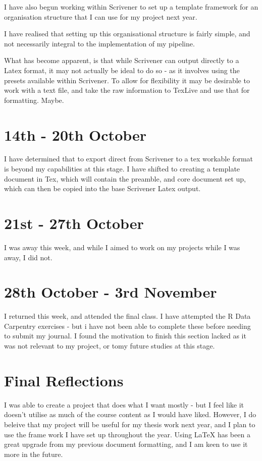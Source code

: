 \documentclass{article}
\begin{document}
I have also begun working within Scrivener to set up a template framework for an organisation structure that I can use for my project next year.

I have realised that setting up this organisational structure is fairly simple, and not necessarily integral to the implementation of my pipeline. 

What has become apparent, is that while Scrivener can output directly to a Latex format, it may not actually be ideal to do so - as it involves using the presets available within Scrivener. To allow for flexibility it may be desirable to work with a text file, and take the raw information to TexLive and use that for formatting. Maybe.

\section{14th - 20th October}

I have determined that to export direct from Scrivener to a tex workable format is beyond my capabilities at this stage. I have shifted to creating a template document in Tex, which will contain the preamble, and core document set up, which can then be copied into the base Scrivener Latex output. 

\section{21st - 27th October}

I was away this week, and while I aimed to work on my projects while I was away, I did not. 

\section{28th October - 3rd November}

I returned this week, and attended the final class. 
I have attempted the R Data Carpentry exercises - but i have not been able to complete these before needing to submit my journal. 
I found the motivation to finish this section lacked as it was not relevant to my project, or tomy future studies at this stage.

\section*{Final Reflections}

I was able to create a project that does what I want mostly - but I feel like it doesn't utilise as much of the course content as I would have liked. However, I do beleive that my project will be useful for my thesis work next year, and I plan to use the frame work I have set up throughout the year. 
Using LaTeX has been a great upgrade from my previous document formatting, and I am keen to use it more in the future.
\end{document}

